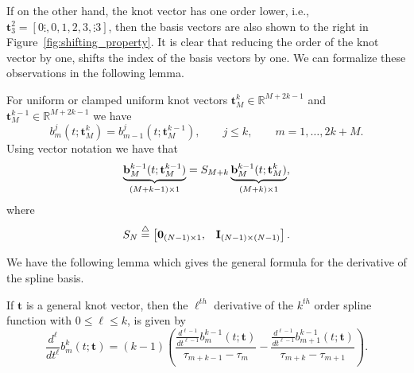 If on the other hand, the knot vector has one order lower, i.e., $\mathbf{t}_3^2 = [0\vdots, 0, 1, 2, 3, \vdots 3]$, then the basis vectors are also shown to the right in Figure~\ref{fig:shifting_property}.  It is clear that reducing the order of the knot vector by one, shifts the index of the basis vectors by one.  We can formalize these observations in the following lemma.
\begin{lemma} \label{lem:shifting_property}
For uniform or clamped uniform knot vectors $\mathbf{t}_M^k \in \mathbb{R}^{M+2k-1}$ and $\mathbf{t}_M^{k-1}\in\mathbb{R}^{M+2k-1}$ we have
\[
b_m^j(t; \mathbf{t}_M^k) = b_{m-1}^j(t; \mathbf{t}_M^{k-1}), \qquad j \leq k, \qquad m = 1, \dots, 2k+M.
\]	
Using vector notation we have that
\[
\underbrace{\mathbf{b}_M^{k-1}(t; \mathbf{t}_M^{k-1})}_{(M+k-1)\times 1} = S_{M+k} \underbrace{\mathbf{b}_M^{k-1}(t; \mathbf{t}_M^k)}_{(M+k)\times 1},
\]
where
\[
	S_{N} \stackrel{\triangle}{=} \begin{bmatrix} \mathbf{0}_{(N-1)\times 1}, & \mathbf{I}_{(N-1) \times (N-1)} \end{bmatrix}.
\]
\end{lemma}

We have the following lemma which gives the general formula for the derivative of the spline basis.
\begin{lemma}\label{lem:derivative_basis_functions}
If $\mathbf{t}$ is a general knot vector, then the $\ell^{th}$ derivative of the $k^{th}$ order spline function with  $0\leq \ell \leq k$, is given by
\[
\frac{d^\ell}{dt^\ell}b_m^k(t; \mathbf{t}) = (k-1)\left(\frac{\frac{d^{\ell-1}}{dt^{\ell-1}}b_m^{k-1}(t; \mathbf{t})}{\tau_{m+k-1}-\tau_m} - \frac{\frac{d^{\ell-1}}{dt^{\ell-1}}b_{m+1}^{k-1}(t; \mathbf{t})}{\tau_{m+k}-\tau_{m+1}} \right).
\]	
\end{lemma}

